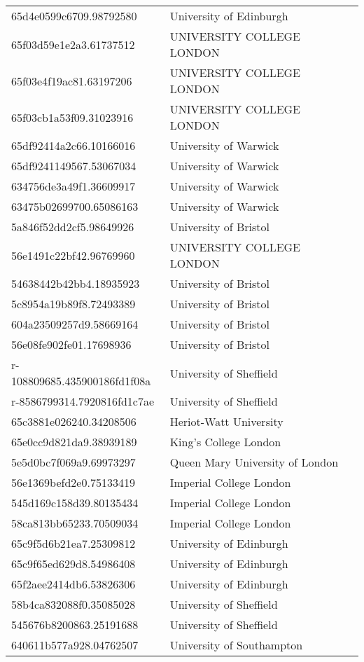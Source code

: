 \begin{tabular}{ll}
65d4e0599c6709.98792580 & University of Edinburgh \\
65f03d59e1e2a3.61737512 & UNIVERSITY COLLEGE LONDON \\
65f03e4f19ac81.63197206 & UNIVERSITY COLLEGE LONDON \\
65f03cb1a53f09.31023916 & UNIVERSITY COLLEGE LONDON \\
65df92414a2c66.10166016 & University of Warwick \\
65df9241149567.53067034 & University of Warwick \\
634756de3a49f1.36609917 & University of Warwick \\
63475b02699700.65086163 & University of Warwick \\
5a846f52dd2cf5.98649926 & University of Bristol \\
56e1491c22bf42.96769960 & UNIVERSITY COLLEGE LONDON \\
54638442b42bb4.18935923 & University of Bristol \\
5c8954a19b89f8.72493389 & University of Bristol \\
604a23509257d9.58669164 & University of Bristol \\
56e08fe902fe01.17698936 & University of Bristol \\
r-108809685.435900186fd1f08a & University of Sheffield \\
r-8586799314.7920816fd1c7ae & University of Sheffield \\
65c3881e026240.34208506 & Heriot-Watt University \\
65e0cc9d821da9.38939189 & King's College London \\
5e5d0bc7f069a9.69973297 & Queen Mary University of London \\
56e1369befd2e0.75133419 & Imperial College London \\
545d169c158d39.80135434 & Imperial College London \\
58ca813bb65233.70509034 & Imperial College London \\
65c9f5d6b21ea7.25309812 & University of Edinburgh \\
65c9f65ed629d8.54986408 & University of Edinburgh \\
65f2aee2414db6.53826306 & University of Edinburgh \\
58b4ca832088f0.35085028 & University of Sheffield \\
545676b8200863.25191688 & University of Sheffield \\
640611b577a928.04762507 & University of Southampton \\

\end{tabular}
